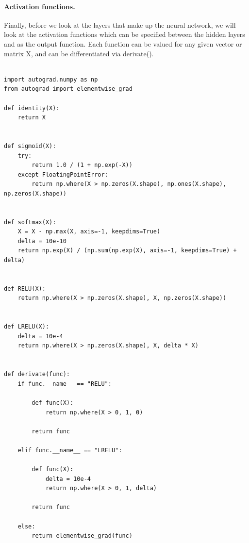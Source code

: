 \documentclass[%
oneside,                 %
final,                   %
10pt]{article}
\begin{document}
\paragraph{Activation functions.}
Finally, before we look at the layers that make up the neural network,
we will look at the activation functions which can be specified
between the hidden layers and as the output function. Each function
can be valued for any given vector or matrix X, and can be
differentiated via derivate().


















































\begin{verbatim}

import autograd.numpy as np
from autograd import elementwise_grad

def identity(X):
    return X


def sigmoid(X):
    try:
        return 1.0 / (1 + np.exp(-X))
    except FloatingPointError:
        return np.where(X > np.zeros(X.shape), np.ones(X.shape), np.zeros(X.shape))


def softmax(X):
    X = X - np.max(X, axis=-1, keepdims=True)
    delta = 10e-10
    return np.exp(X) / (np.sum(np.exp(X), axis=-1, keepdims=True) + delta)


def RELU(X):
    return np.where(X > np.zeros(X.shape), X, np.zeros(X.shape))


def LRELU(X):
    delta = 10e-4
    return np.where(X > np.zeros(X.shape), X, delta * X)


def derivate(func):
    if func.__name__ == "RELU":

        def func(X):
            return np.where(X > 0, 1, 0)

        return func

    elif func.__name__ == "LRELU":

        def func(X):
            delta = 10e-4
            return np.where(X > 0, 1, delta)

        return func

    else:
        return elementwise_grad(func)

\end{verbatim}
\end{document}
